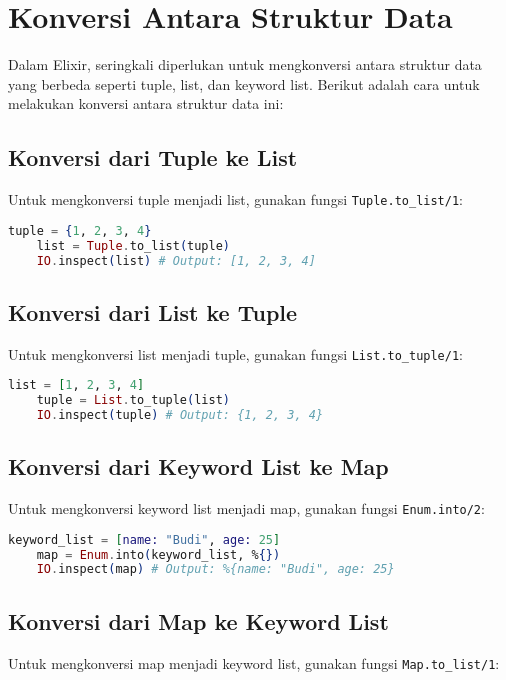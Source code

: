 \section{Konversi Antara Struktur Data}

Dalam Elixir, seringkali diperlukan untuk mengkonversi antara struktur data yang berbeda seperti tuple, list, dan keyword list. Berikut adalah cara untuk melakukan konversi antara struktur data ini:

\subsection{Konversi dari Tuple ke List}
Untuk mengkonversi tuple menjadi list, gunakan fungsi \texttt{Tuple.to\_list/1}:

\begin{lstlisting}[language=Elixir]
	tuple = {1, 2, 3, 4}
	list = Tuple.to_list(tuple)
	IO.inspect(list) # Output: [1, 2, 3, 4]
\end{lstlisting}

\subsection{Konversi dari List ke Tuple}
Untuk mengkonversi list menjadi tuple, gunakan fungsi \texttt{List.to\_tuple/1}:

\begin{lstlisting}[language=Elixir]
	list = [1, 2, 3, 4]
	tuple = List.to_tuple(list)
	IO.inspect(tuple) # Output: {1, 2, 3, 4}
\end{lstlisting}

\subsection{Konversi dari Keyword List ke Map}
Untuk mengkonversi keyword list menjadi map, gunakan fungsi \texttt{Enum.into/2}:

\begin{lstlisting}[language=Elixir]
	keyword_list = [name: "Budi", age: 25]
	map = Enum.into(keyword_list, %{})
	IO.inspect(map) # Output: %{name: "Budi", age: 25}
\end{lstlisting}

\subsection{Konversi dari Map ke Keyword List}
Untuk mengkonversi map menjadi keyword list, gunakan fungsi \texttt{Map.to\_list/1}:

